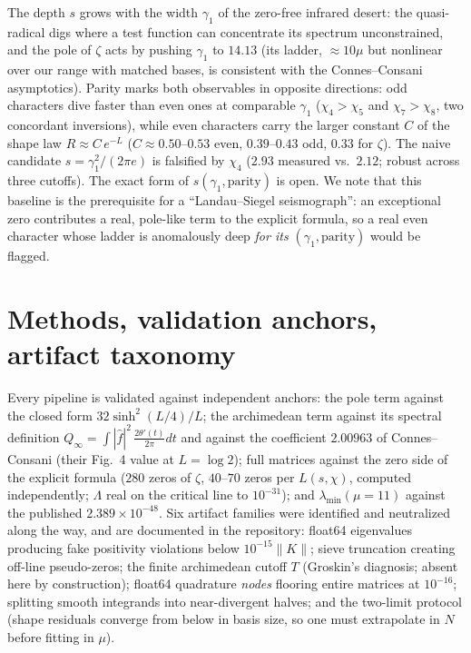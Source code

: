 \documentclass[10pt]{article}
\newcommand{\norm}[1]{\lVert #1\rVert}
\begin{document}
\smallskip\noindent
The depth $s$ grows with the width $\gamma_1$ of the zero-free
infrared desert: the quasi-radical digs where a test function can
concentrate its spectrum unconstrained, and the pole of $\zeta$ acts by
pushing $\gamma_1$ to $14.13$ (its ladder, $\approx10\mu$ but nonlinear
over our range with matched bases, is consistent with the
Connes--Consani asymptotics). Parity marks both observables in opposite
directions: odd characters dive faster than even ones at comparable
$\gamma_1$ ($\chi_4>\chi_5$ and $\chi_7>\chi_8$, two concordant
inversions), while even characters carry the larger constant $C$ of the
shape law $R\approx C\,e^{-L}$ ($C\approx0.50$--$0.53$ even,
$0.39$--$0.43$ odd, $0.33$ for $\zeta$). The naive candidate
$s=\gamma_1^2/(2\pi e)$ is falsified by $\chi_4$ ($2.93$ measured vs.\
$2.12$; robust across three cutoffs). The exact form of
$s(\gamma_1,\text{parity})$ is open. We note that this baseline is the
prerequisite for a ``Landau--Siegel seismograph'': an exceptional zero
contributes a real, pole-like term to the explicit formula, so a real
even character whose ladder is anomalously deep \emph{for its
$(\gamma_1,\text{parity})$} would be flagged.

\section{Methods, validation anchors, artifact taxonomy}

Every pipeline is validated against independent anchors: the pole term
against the closed form $32\sinh^2(L/4)/L$; the archimedean term
against its spectral definition $Q_\infty=\int|\hat f|^2\,
\frac{2\theta'(t)}{2\pi}dt$ and against the coefficient $2.00963$ of
Connes--Consani (their Fig.~4 value at $L=\log2$); full matrices
against the zero side of the explicit formula ($280$ zeros of $\zeta$,
$40$--$70$ zeros per $L(s,\chi)$, computed independently; $\Lambda$
real on the critical line to $10^{-31}$); and
$\lambda_{\min}(\mu{=}11)$ against the published
$2.389\times10^{-48}$. Six artifact families were identified and
neutralized along the way, and are documented in the repository:
float64 eigenvalues producing fake positivity violations below
$10^{-15}\norm{K}$; sieve truncation creating off-line pseudo-zeros;
the finite archimedean cutoff $T$ (Groskin's diagnosis; absent here by
construction); float64 quadrature \emph{nodes} flooring entire matrices
at $10^{-16}$; splitting smooth integrands into near-divergent halves;
and the two-limit protocol (shape residuals converge from below in
basis size, so one must extrapolate in $N$ before fitting in $\mu$).
\end{document}

